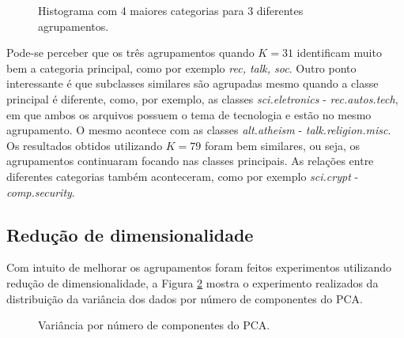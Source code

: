 \documentclass[conference]{IEEEtran}
\begin{document}
\begin{figure}[!h]
	\centering
	{
	}
	\caption{\small Histograma com 4 maiores categorias para 3 diferentes agrupamentos.}
	\label{fig:clusters}
\end{figure}

Pode-se perceber que os três agrupamentos quando $K = 31$ identificam muito bem a categoria principal, como por exemplo \emph{rec, talk, soc}. Outro ponto interessante é que subclasses similares são agrupadas mesmo quando a classe principal é diferente, como, por exemplo, as classes \emph{sci.eletronics} - \emph{rec.autos.tech}, em que ambos os arquivos possuem o tema de tecnologia e estão no mesmo agrupamento. O mesmo acontece com as classes \emph{alt.atheism} - \emph{talk.religion.misc}. Os resultados obtidos utilizando $K = 79$ foram bem similares, ou seja, os agrupamentos continuaram focando nas classes principais. As relações entre diferentes categorias também aconteceram, como por exemplo \emph{sci.crypt} - \emph{comp.security}.


\subsection{Redução de dimensionalidade}

Com intuito de melhorar os agrupamentos foram feitos experimentos utilizando redução de dimensionalidade, a Figura \ref{fig:var_comp} mostra o experimento realizados da distribuição da variância dos dados por número de componentes do PCA.

\begin{figure}[!h]
	\centering
	{
	}
	\caption{\small Variância por número de componentes do PCA.}
	\label{fig:var_comp}
\end{figure}
\end{document}
